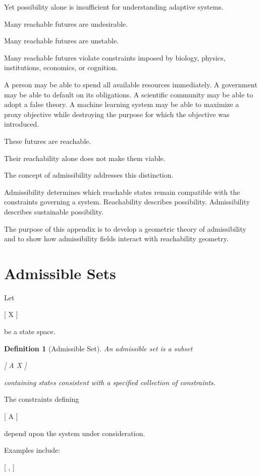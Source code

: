 \documentclass[11pt,oneside,openany]{book}
\newtheorem{definition}{Definition}[chapter] \newtheorem{theorem}{Theorem}[chapter] \newtheorem{proposition}{Proposition}[chapter] \newtheorem{lemma}{Lemma}[chapter] \newtheorem{corollary}{Corollary}[chapter] \newtheorem{remark}{Remark}[chapter]
\begin{document}
Yet possibility alone is insufficient for understanding adaptive systems.

Many reachable futures are undesirable.

Many reachable futures are unstable.

Many reachable futures violate constraints imposed by biology, physics, institutions, economics, or cognition.

A person may be able to spend all available resources immediately. A government may be able to default on its obligations. A scientific community may be able to adopt a false theory. A machine learning system may be able to maximize a proxy objective while destroying the purpose for which the objective was introduced.

These futures are reachable.

Their reachability alone does not make them viable.

The concept of admissibility addresses this distinction.

Admissibility determines which reachable states remain compatible with the constraints governing a system. Reachability describes possibility. Admissibility describes sustainable possibility.

The purpose of this appendix is to develop a geometric theory of admissibility and to show how admissibility fields interact with reachability geometry.

\section{Admissible Sets}

Let

[
X
]

be a state space.

\begin{definition}[Admissible Set]

An admissible set is a subset

[
\mathcal A
\subseteq
X
]

containing states consistent with a specified collection of constraints.

\end{definition}

The constraints defining

[
\mathcal A
]

depend upon the system under consideration.

Examples include:

[
,
]
\end{document}
